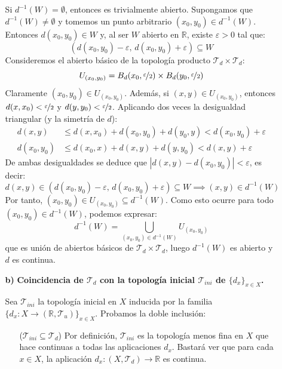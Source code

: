 \begin{enumerate}
\begin{sol}
\begin{enumerate}
\begin{dem}
    Si $d^{-1}(W) = \emptyset$, entonces es trivialmente abierto. Supongamos que $d^{-1}(W) \neq \emptyset$ y tomemos un punto arbitrario $(x_0, y_0) \in d^{-1}(W)$. Entonces $d(x_0, y_0) \in W$ y, al ser $W$ abierto en $\mathbb{R}$, existe $\varepsilon > 0$ tal que:
    \[
        (d(x_0, y_0) - \varepsilon, \, d(x_0, y_0) + \varepsilon) \subseteq W
    \]
    Consideremos el abierto básico de la topología producto $\mathcal{T}_d \times \mathcal{T}_d$:
    \[
        U_{(x_0, y_0)} = B_d(x_0, \nicefrac{\varepsilon}{2}) \times B_d(y_0, \nicefrac{\varepsilon}{2})
    \]
    Claramente $(x_0, y_0) \in U_{(x_0, y_0)}$. Además, si $(x, y) \in U_{(x_0, y_0)}$, entonces $d(x, x_0) < \nicefrac{\varepsilon}{2}$ y $d(y, y_0) < \nicefrac{\varepsilon}{2}$. Aplicando dos veces la desigualdad triangular (y la simetría de $d$):
    \begin{align*}
        d(x, y) &\le d(x, x_0) + d(x_0, y_0) + d(y_0, y) < d(x_0, y_0) + \varepsilon \\
        d(x_0, y_0) &\le d(x_0, x) + d(x, y) + d(y, y_0) < d(x, y) + \varepsilon
    \end{align*}
    De ambas desigualdades se deduce que $|d(x, y) - d(x_0, y_0)| < \varepsilon$, es decir:
    \[
        d(x, y) \in (d(x_0, y_0) - \varepsilon, \, d(x_0, y_0) + \varepsilon) \subseteq W \implies (x, y) \in d^{-1}(W)
    \]
    Por tanto, $(x_0, y_0) \in U_{(x_0, y_0)} \subseteq d^{-1}(W)$. Como esto ocurre para todo $(x_0, y_0) \in d^{-1}(W)$, podemos expresar:
    \[
        d^{-1}(W) = \bigcup_{(x_0, y_0) \in d^{-1}(W)} U_{(x_0, y_0)}
    \]
    que es unión de abiertos básicos de $\mathcal{T}_d \times \mathcal{T}_d$, luego $d^{-1}(W)$ es abierto y $d$ es continua.
    \end{dem}

    \item[\textbf{b)}] \textbf{Coincidencia de $\mathcal{T}_d$ con la topología inicial $\mathcal{T}_{ini}$ de $\{d_x\}_{x \in X}$.}
    
    \begin{dem}
        Sea $\mathcal{T}_{ini}$ la topología inicial en $X$ inducida por la familia $\{d_x : X \to (\mathbb{R}, \mathcal{T}_u)\}_{x \in X}$. Probamos la doble inclusión:

        \begin{itemize}
            \item[($\mathcal{T}_{ini} \subseteq \mathcal{T}_d$)] Por definición, $\mathcal{T}_{ini}$ es la topología menos fina en $X$ que hace continuas a todas las aplicaciones $d_x$. Bastará ver que para cada $x \in X$, la aplicación $d_x : (X, \mathcal{T}_d) \to \mathbb{R}$ es continua.
            

\end{itemize}
\end{dem}
\end{enumerate}
\end{sol}
\end{enumerate}
